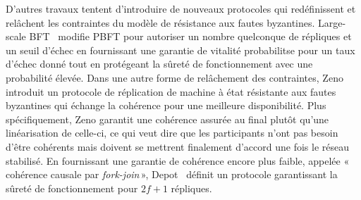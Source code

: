 {%

D'autres travaux tentent d'introduire de nouveaux protocoles qui redéfinissent et relâchent les contraintes du modèle
de résistance aux fautes byzantines. Large-scale BFT~\cite{rodrigues2007large} modifie
PBFT pour autoriser un nombre quelconque de répliques et un seuil d'échec en
fournissant une garantie de vi\-talité probabilitse pour un taux d'échec donné tout en protégeant la sûreté de
fonctionnement avec une probabilité élevée. Dans une autre forme de relâchement des contraintes,
Zeno~\cite{singh2009zeno} introduit un protocole de réplication de machine à état résistante aux fautes byzantines qui
échange la cohérence pour une meilleure disponibilité. Plus spécifiquement, Zeno garantit une cohérence assurée au final
plutôt qu'une linéarisation de celle-ci, ce qui veut dire que les participants n'ont pas besoin d'être cohérents mais
doivent se mettrent finalement d'accord une fois le réseau stabilisé. En fournissant une garantie de cohérence encore
plus faible, appelée «\,cohérence causale par \emph{fork-join}\,», Depot~\cite{mahajan2011depot} définit un protocole
garantissant la sûreté de fonctionnement pour $2f+1$ répliques.

}
